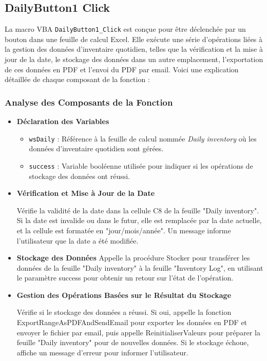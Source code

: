\documentclass[a4paper, oneside, 12pt, final]{extreport}
\begin{document}
\subsection{DailyButton1 Click}

La macro VBA \texttt{DailyButton1\_Click} est conçue pour être déclenchée par un bouton dans une feuille de calcul Excel. Elle exécute une série d'opérations liées à la gestion des données d'inventaire quotidien, telles que la vérification et la mise à jour de la date, le stockage des données dans un autre emplacement, l'exportation de ces données en PDF et l'envoi du PDF par email. Voici une explication détaillée de chaque composant de la fonction :



\subsubsection{Analyse des Composants de la Fonction}
\begin{itemize}

\item\textbf{Déclaration des Variables}

\begin{itemize}
    \item \texttt{wsDaily} : Référence à la feuille de calcul nommée \textit{Daily inventory} où les données d'inventaire quotidien sont gérées.
    \item \texttt{success} : Variable booléenne utilisée pour indiquer si les opérations de stockage des données ont réussi.
\end{itemize}

\item\textbf{Vérification et Mise à Jour de la Date}

Vérifie la validité de la date dans la cellule C8 de la feuille "Daily inventory". Si la date est invalide ou dans le futur, elle est remplacée par la date actuelle, et la cellule est formatée en "jour/mois/année". Un message informe l'utilisateur que la date a été modifiée.

\item\textbf{Stockage des Données}
Appelle la procédure Stocker pour transférer les données de la feuille "Daily inventory" à la feuille "Inventory Log", en utilisant le paramètre success pour obtenir un retour sur l'état de l'opération.

\item\textbf{Gestion des Opérations Basées sur le Résultat du Stockage}

Vérifie si le stockage des données a réussi. Si oui, appelle la fonction ExportRangeAsPDFAndSendEmail pour exporter les données en PDF et envoyer le fichier par email, puis appelle ReinitialiserValeurs pour préparer la feuille "Daily inventory" pour de nouvelles données. Si le stockage échoue, affiche un message d'erreur pour informer l'utilisateur.
\end{itemize}
\end{document}

